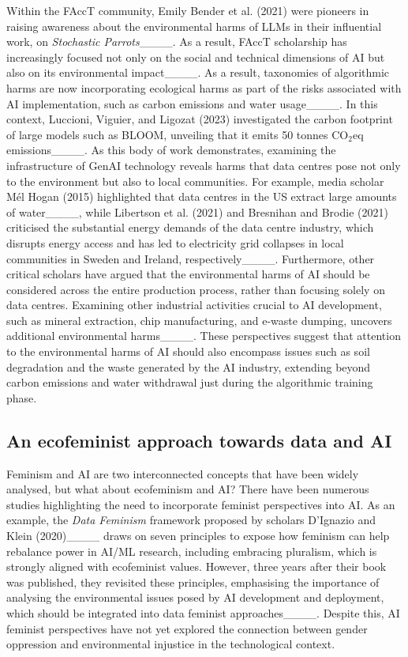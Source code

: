 Within the FAccT community, Emily Bender et al. (2021) were pioneers in raising awareness about the environmental harms of LLMs in their influential work, on \textit{Stochastic Parrots}____. As a result, FAccT scholarship has increasingly focused not only on the social and technical dimensions of AI but also on its environmental impact____. As a result, taxonomies of algorithmic harms are now incorporating ecological harms as part of the risks associated with AI implementation, such as carbon emissions and water usage____.  In this context, Luccioni, Viguier, and Ligozat (2023) investigated the carbon footprint of large models such as BLOOM, unveiling that it emits 50 tonnes CO$_2$eq emissions____. As this body of work demonstrates, examining the infrastructure of GenAI technology reveals harms that data centres pose not only to the environment but also to local communities. For example, media scholar Mél Hogan (2015) highlighted that data centres in the US extract large amounts of water____, while Libertson et al. (2021) and Bresnihan and Brodie (2021) criticised the substantial energy demands of the data centre industry, which disrupts energy access and has led to electricity grid collapses in local communities in Sweden and Ireland, respectively____. Furthermore, other critical scholars have argued that the environmental harms of AI should be considered across the entire production process, rather than focusing solely on data centres. Examining other industrial activities crucial to AI development, such as mineral extraction, chip manufacturing, and e-waste dumping, uncovers additional environmental harms____. These perspectives suggest that attention to the environmental harms of AI should also encompass issues such as soil degradation and the waste generated by the AI industry, extending beyond carbon emissions and water withdrawal just during the algorithmic training phase.


\subsection{An ecofeminist approach towards data and AI}

Feminism and AI are two interconnected concepts that have been widely analysed, but what about ecofeminism and AI? There have been numerous studies highlighting the need to incorporate feminist perspectives into AI. As an example, the \textit{Data Feminism} framework proposed by scholars D'Ignazio and Klein (2020)____ draws on seven principles to expose how feminism can help rebalance power in AI/ML research, including embracing pluralism, which is strongly aligned with ecofeminist values. However, three years after their book was published, they revisited these principles, emphasising the importance of analysing the environmental issues posed by AI development and deployment, which should be integrated into data feminist approaches____. Despite this, AI feminist perspectives have not yet explored the connection between gender oppression and environmental injustice in the technological context. 

